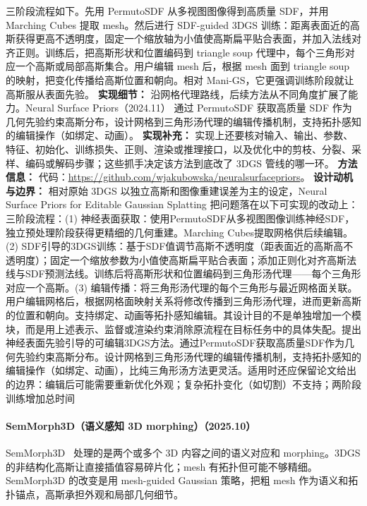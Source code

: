 三阶段流程如下。先用 PermutoSDF 从多视图图像得到高质量 SDF，并用 Marching Cubes 提取 mesh。然后进行 SDF-guided 3DGS 训练：距离表面近的高斯获得更高不透明度，固定一个缩放轴为小值使高斯扁平贴合表面，并加入法线对齐正则。训练后，把高斯形状和位置编码到 triangle soup 代理中，每个三角形对应一个高斯或局部高斯集合。用户编辑 mesh 后，根据 mesh 面到 triangle soup 的映射，把变化传播给高斯位置和朝向。相对 Mani-GS，它更强调训练阶段就让高斯服从表面先验。
\textbf{实现细节：} 沿网格代理路线，后续方法从不同角度扩展了能力。Neural Surface Priors（2024.11） 通过 PermutoSDF 获取高质量 SDF 作为几何先验约束高斯分布，设计网格到三角形汤代理的编辑传播机制，支持拓扑感知的编辑操作（如绑定、动画）。
\textbf{实现补充：} 实现上还要核对输入、输出、参数、特征、初始化、训练损失、正则、渲染或推理接口，以及优化中的剪枝、分裂、采样、编码或解码步骤；这些抓手决定该方法到底改了 3DGS 管线的哪一环。
\textbf{方法信息：} 代码：\url{https://github.com/wjakubowska/neuralsurfacepriors}。
\textbf{设计动机与边界：} 相对原始 3DGS 以独立高斯和图像重建误差为主的设定，Neural Surface Priors for Editable Gaussian Splatting 把问题落在以下可实现的改动上：三阶段流程：(1) 神经表面获取：使用PermutoSDF从多视图图像训练神经SDF，独立预处理阶段获得更精细的几何重建。Marching Cubes提取网格供后续编辑。(2) SDF引导的3DGS训练：基于SDF值调节高斯不透明度（距表面近的高斯高不透明度）；固定一个缩放参数为小值使高斯扁平贴合表面；添加正则化对齐高斯法线与SDF预测法线。训练后将高斯形状和位置编码到三角形汤代理——每个三角形对应一个高斯。(3) 编辑传播：将三角形汤代理的每个三角形与最近网格面关联。用户编辑网格后，根据网格面映射关系将修改传播到三角形汤代理，进而更新高斯的位置和朝向。支持绑定、动画等拓扑感知编辑。其设计目的不是单独增加一个模块，而是用上述表示、监督或渲染约束消除原流程在目标任务中的具体失配。提出神经表面先验引导的可编辑3DGS方法。通过PermutoSDF获取高质量SDF作为几何先验约束高斯分布。设计网格到三角形汤代理的编辑传播机制，支持拓扑感知的编辑操作（如绑定、动画），比纯三角形汤方法更灵活。适用时还应保留论文给出的边界：编辑后可能需要重新优化外观；复杂拓扑变化（如切割）不支持；两阶段训练增加总时间
\paragraph{SemMorph3D（语义感知 3D morphing）（2025.10）}
SemMorph3D~\cite{2510_02034} 处理的是两个或多个 3D 内容之间的语义对应和 morphing。3DGS 的非结构化高斯让直接插值容易碎片化；mesh 有拓扑但可能不够精细。SemMorph3D 的改变是用 mesh-guided Gaussian 策略，把粗 mesh 作为语义和拓扑锚点，高斯承担外观和局部几何细节。

